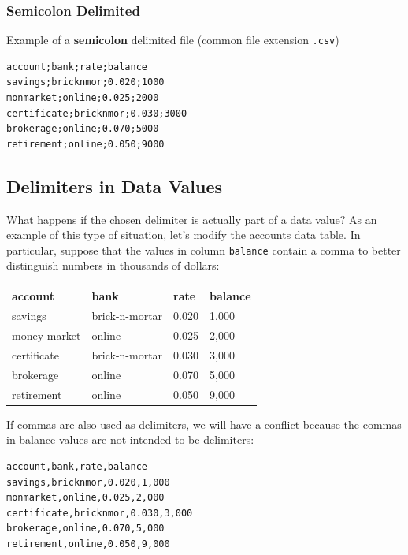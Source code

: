 \documentclass[
]{book}
\begin{document}
\hypertarget{semicolon-delimited}{%
\subsubsection*{Semicolon Delimited}\label{semicolon-delimited}}

Example of a \textbf{semicolon} delimited file (common file extension \texttt{.csv})

\begin{verbatim}
account;bank;rate;balance
savings;bricknmor;0.020;1000
monmarket;online;0.025;2000
certificate;bricknmor;0.030;3000
brokerage;online;0.070;5000
retirement;online;0.050;9000
\end{verbatim}

\hypertarget{delimiters-in-data-values}{%
\subsection{Delimiters in Data Values}\label{delimiters-in-data-values}}

What happens if the chosen delimiter is actually part of a data value? As an
example of this type of situation, let's modify the accounts data table.
In particular, suppose that the values in column \texttt{balance} contain a comma
to better distinguish numbers in thousands of dollars:

\begin{longtable}[]{@{}llll@{}}
\toprule()
account & bank & rate & balance \\
\midrule()
\endhead
savings & brick-n-mortar & 0.020 & 1,000 \\
money market & online & 0.025 & 2,000 \\
certificate & brick-n-mortar & 0.030 & 3,000 \\
brokerage & online & 0.070 & 5,000 \\
retirement & online & 0.050 & 9,000 \\
\bottomrule()
\end{longtable}

If commas are also used as delimiters, we will have a conflict because the
commas in balance values are not intended to be delimiters:

\begin{verbatim}
account,bank,rate,balance
savings,bricknmor,0.020,1,000
monmarket,online,0.025,2,000
certificate,bricknmor,0.030,3,000
brokerage,online,0.070,5,000
retirement,online,0.050,9,000
\end{verbatim}
\end{document}
